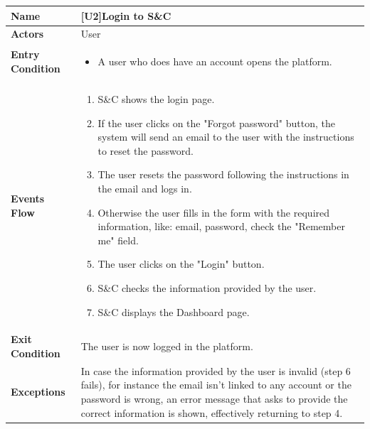 \begin{center}
    \begin{tabular}{|p{9em}|p{27em}|}
        \hline
        \rowcolor{bluepoli!40}
        \textbf{Name} & \textbf{[U2]Login to S\&C} \\
        \hline
        \textbf{Actors} & User \\
        \hline
        \textbf{Entry Condition} & 
        \begin{itemize}
            \item A user who does have an account opens the platform.
        \end{itemize} \\
        \hline
        \textbf{Events Flow} & 
        \begin{enumerate}
            \item S\&C shows the login page.
            \item If the user clicks on the "Forgot password" button, the system will send an email to the user with the instructions to reset the password.
            \item The user resets the password following the instructions in the email and logs in.
            \item Otherwise the user fills in the form with the required information, like: email, password, check the "Remember me" field.
            \item The user clicks on the "Login" button.
            \item S\&C checks the information provided by the user.
            \item S\&C displays the Dashboard page. 
        \end{enumerate} \\
        \hline
        \textbf{Exit Condition} & The user is now logged in the platform. \\
        \hline
        \textbf{Exceptions} & In case the information provided by the user is invalid (step 6 fails), for instance the email isn't linked to
        any account or the password is wrong, an error message that asks to provide the correct information is shown, effectively 
        returning to step 4. \\
        \hline
    \end{tabular}
\end{center}

